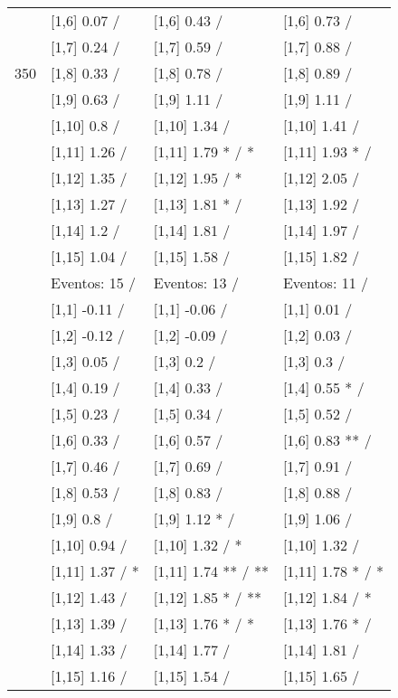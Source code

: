 \begin{table}
\begin{tabular}[t]{llll}
 & {}[1,6] 0.07  / & {}[1,6] 0.43  / & {}[1,6] 0.73  /\\
 & {}[1,7] 0.24  / & {}[1,7] 0.59  / & {}[1,7] 0.88  /\\
350 & {}[1,8] 0.33  / & {}[1,8] 0.78  / & {}[1,8] 0.89  /\\
\addlinespace
 & {}[1,9] 0.63  / & {}[1,9] 1.11  / & {}[1,9] 1.11  /\\
 & {}[1,10] 0.8  / & {}[1,10] 1.34  / & {}[1,10] 1.41  /\\
 & {}[1,11] 1.26  / & {}[1,11] 1.79 * / * & {}[1,11] 1.93 * /\\
 & {}[1,12] 1.35  / & {}[1,12] 1.95  / * & {}[1,12] 2.05  /\\
 & {}[1,13] 1.27  / & {}[1,13] 1.81 * / & {}[1,13] 1.92  /\\
\addlinespace
 & {}[1,14] 1.2  / & {}[1,14] 1.81  / & {}[1,14] 1.97  /\\
 & {}[1,15] 1.04  / & {}[1,15] 1.58  / & {}[1,15] 1.82  /\\
 & Eventos:  15 / & Eventos:  13 / & Eventos:  11 /\\
 & {}[1,1] -0.11  / & {}[1,1] -0.06  / & {}[1,1] 0.01  /\\
 & {}[1,2] -0.12  / & {}[1,2] -0.09  / & {}[1,2] 0.03  /\\
\addlinespace
 & {}[1,3] 0.05  / & {}[1,3] 0.2  / & {}[1,3] 0.3  /\\
 & {}[1,4] 0.19  / & {}[1,4] 0.33  / & {}[1,4] 0.55 * /\\
 & {}[1,5] 0.23  / & {}[1,5] 0.34  / & {}[1,5] 0.52  /\\
 & {}[1,6] 0.33  / & {}[1,6] 0.57  / & {}[1,6] 0.83 ** /\\
 & {}[1,7] 0.46  / & {}[1,7] 0.69  / & {}[1,7] 0.91  /\\
\addlinespace
500 & {}[1,8] 0.53  / & {}[1,8] 0.83  / & {}[1,8] 0.88  /\\
 & {}[1,9] 0.8  / & {}[1,9] 1.12 * / & {}[1,9] 1.06  /\\
 & {}[1,10] 0.94  / & {}[1,10] 1.32  / * & {}[1,10] 1.32  /\\
 & {}[1,11] 1.37  / * & {}[1,11] 1.74 ** / ** & {}[1,11] 1.78 * / *\\
 & {}[1,12] 1.43  / & {}[1,12] 1.85 * / ** & {}[1,12] 1.84  / *\\
\addlinespace
 & {}[1,13] 1.39  / & {}[1,13] 1.76 * / * & {}[1,13] 1.76 * /\\
 & {}[1,14] 1.33  / & {}[1,14] 1.77  / & {}[1,14] 1.81  /\\
 & {}[1,15] 1.16  / & {}[1,15] 1.54  / & {}[1,15] 1.65  /\\
\bottomrule
\end{tabular}
\end{table}
